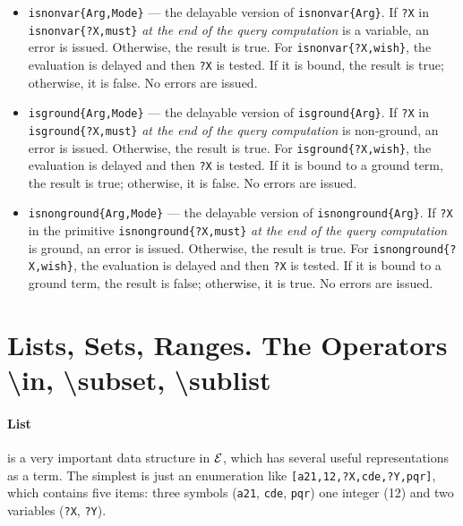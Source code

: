 \documentclass[11pt]{article}
\newcommand{\ERGO}{\mbox{\ensuremath{\cal{E}}\smaller{{\sc{RGO}}}}\xspace}
\newcommand{\FLSYSTEM}{\ERGO}
\newcommand{\bs}{\textbackslash}
\begin{document}
\begin{itemize}
  For \texttt{isvar\{?X,wish\}}, the
  evaluation is delayed and then \texttt{?X} is tested. If it is unbound,
  the result is true; otherwise, it is false. No errors are issued. 
\item \texttt{isnonvar\{Arg,Mode\}} --- the delayable version of
  \texttt{isnonvar\{Arg\}}.  If \texttt{?X} in
  \texttt{isnonvar\{?X,must\}} \emph{at the end of the query computation} is a
  variable, an error is issued. Otherwise, the result is true.
  For \texttt{isnonvar\{?X,wish\}}, the evaluation is delayed and then
  \texttt{?X} is tested. If it is bound, the result is true; otherwise,
  it is false. No errors are issued.
\item \texttt{isground\{Arg,Mode\}} --- the delayable version of
  \texttt{isground\{Arg\}}.  If \texttt{?X} in
  \texttt{isground\{?X,must\}} \emph{at the end of the query computation}
  is non-ground, an error is issued. Otherwise, the result is true.
  For \texttt{isground\{?X,wish\}}, the
  evaluation is delayed and then \texttt{?X} is tested. If it is bound to a
  ground term, the result is true; otherwise, it is false. No errors are
  issued.
\item \texttt{isnonground\{Arg,Mode\}} --- the delayable version of
  \texttt{isnonground\{Arg\}}.  If \texttt{?X} in the primitive
  \texttt{isnonground\{?X,must\}} \emph{at the end of the query computation}
  is ground, an error is issued. Otherwise, the result is true.
  For \texttt{isnonground\{?X,wish\}}, the
  evaluation is delayed and then \texttt{?X} is tested. If it is bound to a
  ground term, the result is false; otherwise, it is true. No errors are
  issued.
\end{itemize}


\section{Lists, Sets, Ranges. The Operators \bs{}in, \bs{}subset, \bs{}sublist}
\label{sec-ranges-lists}

\paragraph{List} is a very important data structure in \FLSYSTEM, which has
several useful representations as a term. The simplest is just an
enumeration like \texttt{[a21,12,?X,cde,?Y,pqr]}, which contains  five
items: three
symbols (\texttt{a21}, \texttt{cde}, \texttt{pqr}) one integer (12) and two variables
(\texttt{?X}, \texttt{?Y}).
\end{document}
